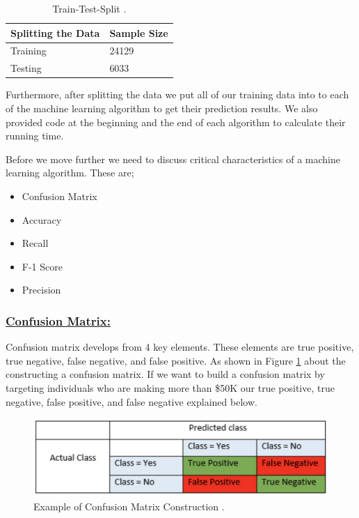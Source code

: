 \documentclass[sigconf]{acmart}
\begin{document}
\begin{table}[!ht]
\centering
\begin{tabular}{|l|l|}
\hline
\textbf{Splitting the Data} & \textbf{Sample Size} \\ \hline
Training                    & 24129                \\ \hline
Testing                     & 6033                 \\ \hline
\end{tabular}
\caption{Train-Test-Split \cite{Borga2017}.}
\label{split}
\end{table}

\par Furthermore, after splitting the data we put all of our training data into to each of the machine learning algorithm to get their prediction results. We also provided code at the beginning and the end of each algorithm to calculate their running time.

\par Before we move further we need to discuss critical characteristics of a machine learning algorithm. These are;

\begin{itemize}
    \item Confusion Matrix
    \item Accuracy
    \item Recall
    \item F-1 Score
    \item Precision 
\end{itemize}

\subsubsection{\textbf{\underline{Confusion Matrix:}}}
Confusion matrix develops from 4 key elements. These elements are true positive, true negative, false negative, and false positive. As shown in Figure \ref{fig:confusion-matrix} about the constructing a confusion matrix. If we want to build a confusion matrix by targeting individuals who are making more than \$50K our true positive, true negative, false positive, and false negative explained below. 

\begin{figure}[!ht]
  \centering
      \includegraphics[width=\columnwidth]{images/confusion-matrix.png}
  \caption{Example of Confusion Matrix Construction \cite{www-exsilio}.}\label{fig:confusion-matrix}
\end{figure}
\end{document}
